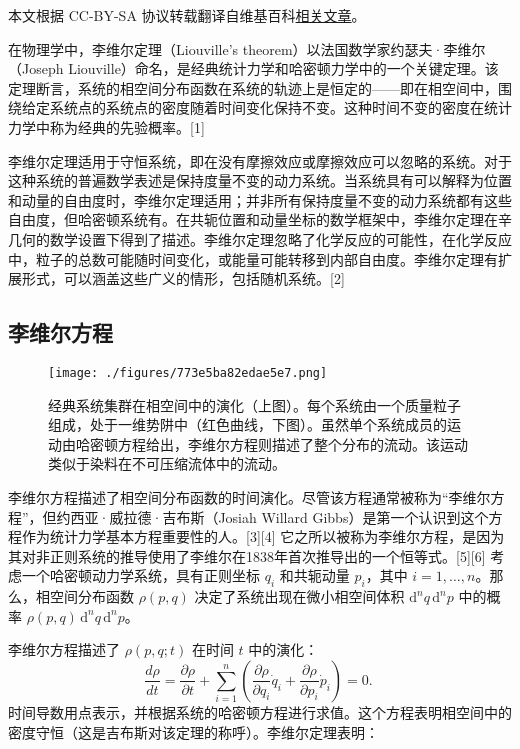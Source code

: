 
本文根据 CC-BY-SA 协议转载翻译自维基百科\href{https://en.wikipedia.org/wiki/Liouville\%27s_theorem_(Hamiltonian)}{相关文章}。

在物理学中，李维尔定理（Liouville's theorem）以法国数学家约瑟夫·李维尔（Joseph Liouville）命名，是经典统计力学和哈密顿力学中的一个关键定理。该定理断言，系统的相空间分布函数在系统的轨迹上是恒定的——即在相空间中，围绕给定系统点的系统点的密度随着时间变化保持不变。这种时间不变的密度在统计力学中称为经典的先验概率。[1]

李维尔定理适用于守恒系统，即在没有摩擦效应或摩擦效应可以忽略的系统。对于这种系统的普遍数学表述是保持度量不变的动力系统。当系统具有可以解释为位置和动量的自由度时，李维尔定理适用；并非所有保持度量不变的动力系统都有这些自由度，但哈密顿系统有。在共轭位置和动量坐标的数学框架中，李维尔定理在辛几何的数学设置下得到了描述。李维尔定理忽略了化学反应的可能性，在化学反应中，粒子的总数可能随时间变化，或能量可能转移到内部自由度。李维尔定理有扩展形式，可以涵盖这些广义的情形，包括随机系统。[2]

\subsection{李维尔方程}
\begin{figure}[ht]
\centering
\texttt{[image: ./figures/773e5ba82edae5e7.png]}
\caption{经典系统集群在相空间中的演化（上图）。每个系统由一个质量粒子组成，处于一维势阱中（红色曲线，下图）。虽然单个系统成员的运动由哈密顿方程给出，李维尔方程则描述了整个分布的流动。该运动类似于染料在不可压缩流体中的流动。} \label{fig_LWR_1}
\end{figure}
李维尔方程描述了相空间分布函数的时间演化。尽管该方程通常被称为“李维尔方程”，但约西亚·威拉德·吉布斯（Josiah Willard Gibbs）是第一个认识到这个方程作为统计力学基本方程重要性的人。[3][4] 它之所以被称为李维尔方程，是因为其对非正则系统的推导使用了李维尔在1838年首次推导出的一个恒等式。[5][6] 考虑一个哈密顿动力学系统，具有正则坐标 \( q_i \) 和共轭动量 \( p_i \)，其中 \( i = 1, \dots , n \)。那么，相空间分布函数 \( \rho(p,q) \) 决定了系统出现在微小相空间体积 \( \mathrm{d}^n q \, \mathrm{d}^n p \) 中的概率 \( \rho(p,q) \, \mathrm{d}^n q \, \mathrm{d}^n p \)。

李维尔方程描述了 \( \rho(p,q;t) \) 在时间 \( t \) 中的演化：
\[
\frac{d\rho}{dt} = \frac{\partial \rho}{\partial t} + \sum_{i=1}^{n} \left( \frac{\partial \rho}{\partial q_i} \dot{q}_i + \frac{\partial \rho}{\partial p_i} \dot{p}_i \right) = 0.~
\]
时间导数用点表示，并根据系统的哈密顿方程进行求值。这个方程表明相空间中的密度守恒（这是吉布斯对该定理的称呼）。李维尔定理表明：

